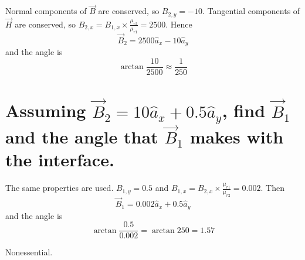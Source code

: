 \documentclass[answers]{exam}
\begin{document}
\begin{questions}
\begin{parts}
    \begin{solution}
        Normal components of $\vec B$ are conserved, so $B_{2,y} = -10$. Tangential components of $\vec H$ are conserved, so $B_{2,x} = B_{1,x}\times\frac{\mu_{r2}}{\mu_{r1}} = 2500$. Hence
        $$\vec B_2 = 2500\hat a_x - 10\hat a_y$$
        and the angle is
        $$\arctan\frac{10}{2500} \approx \frac{1}{250}$$
    \end{solution}
    
    \part{Assuming $\vec B_2 = 10\hat a_x + 0.5\hat a_y$, find $\vec B_1$ and the angle that $\vec B_1$ makes with the interface.}

    \begin{solution}
        The same properties are used. $B_{1,y} = 0.5$ and $B_{1,x} = B_{2,x}\times\frac{\mu_{r1}}{\mu_{r2}} = 0.002$. Then
        $$\vec B_1 = 0.002\hat a_x + 0.5\hat a_y$$
        and the angle is
        $$\arctan\frac{0.5}{0.002} = \arctan 250 = 1.57$$
    \end{solution}
\end{parts}


\begin{solution}
    Nonessential.
\end{solution}



\end{questions}
\end{document}
